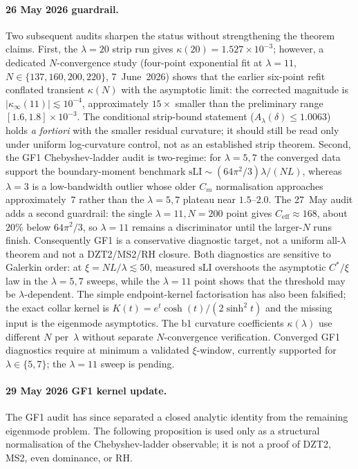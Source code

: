 \documentclass[11pt,a4paper]{article}
\theoremstyle{remark}
\theoremstyle{plain}
\begin{document}
\paragraph{26 May 2026 guardrail.}
Two subsequent audits sharpen the status without strengthening the
theorem claims. First, the $\lambda=20$ strip run gives
$\kappa(20)=1.527\times10^{-3}$; however, a dedicated $N$-convergence
study (four-point exponential fit at $\lambda=11$, $N\in\{137,160,200,220\}$,
7~June~2026) shows that the earlier six-point refit conflated transient
$\kappa(N)$ with the asymptotic limit: the corrected magnitude is
$|\kappa_\infty(11)|\lesssim 10^{-4}$, approximately $15\times$ smaller
than the preliminary range $[1.6,1.8]\times10^{-3}$.
The conditional strip-bound statement ($A_\lambda(\delta)\leq 1.0063$)
holds \emph{a fortiori} with the smaller residual curvature; it should
still be read only under uniform log-curvature control, not as an
established strip theorem. Second, the GF1 Chebyshev-ladder audit is two-regime:
for $\lambda=5,7$ the converged data support the boundary-moment
benchmark $\mathrm{sLI}\sim(64\pi^2/3)\lambda/(NL)$, whereas
$\lambda=3$ is a low-bandwidth outlier whose older $C_m$ normalisation
approaches approximately~$7$ rather than the $\lambda=5,7$ plateau
near $1.5$--$2.0$. The 27~May audit adds a second guardrail: the
single $\lambda=11,N=200$ point gives
$C_{\mathrm{eff}}\approx168$, about $20\%$ below $64\pi^2/3$, so
$\lambda=11$ remains a discriminator until the larger-$N$ runs finish.
Consequently GF1 is a conservative diagnostic target, not a uniform
all-$\lambda$ theorem and not a DZT2/MS2/RH closure. Both diagnostics
are sensitive to Galerkin order: at $\xi = NL/\lambda \lesssim 50$,
measured $\mathrm{sLI}$ overshoots the asymptotic $C^*/\xi$ law in the
$\lambda=5,7$ sweeps, while the $\lambda=11$ point shows that the
threshold may be $\lambda$-dependent. The simple endpoint-kernel
factorisation has also been falsified; the exact collar kernel is
$K(t)=e^t\cosh(t)/(2\sinh^2t)$ and the missing input is the
eigenmode asymptotics. The b1 curvature coefficients $\kappa(\lambda)$
use different $N$ per~$\lambda$ without separate $N$-convergence
verification. Converged GF1 diagnostics require at minimum a validated
$\xi$-window, currently supported for $\lambda \in \{5,7\}$; the
$\lambda = 11$ sweep is pending.

\paragraph{29 May 2026 GF1 kernel update.}
The GF1 audit has since separated a closed analytic identity from the
remaining eigenmode problem.  The following proposition is used only as a
structural normalisation of the Chebyshev-ladder observable; it is not a
proof of DZT2, MS2, even dominance, or RH.
\end{document}
